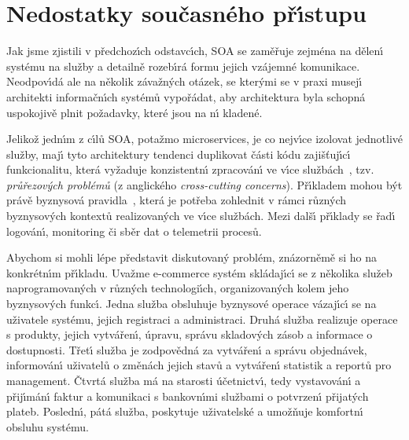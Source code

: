 \section{Nedostatky současného př\'{\i}stupu}

Jak jsme zjistili v předchoz\'{\i}ch odstavc\'{\i}ch, \gls{SOA} se zaměřuje zejména na
dělen\'{\i} systému na služby a detailně rozeb\'{\i}rá formu jejich vzájemné komunikace.
Neodpov\'{\i}dá ale na několik závažn\'ych otázek, se kter\'ymi se v praxi musej\'{\i}
architekti informačn\'{\i}ch systémů vypořádat, aby architektura byla schopná uspokojivě
plnit požadavky, které jsou na n\'{\i} kladené.

Jelikož jedn\'{\i}m z c\'{\i}lů \gls{SOA}, potažmo microservices, je co nejv\'{\i}ce izolovat
jednotlivé služby, maj\'{\i} tyto architektury tendenci duplikovat části kódu
zajišťuj\'{\i}c\'{\i} funkcionalitu, která vyžaduje konzistentn\'{\i} zpracován\'{\i} ve v\'{\i}ce
službách~\cite{cerny2017disambiguation}, tzv. \textit{průřezov\'ych
problémů} (z anglického \textit{cross-cutting concerns}).
Př\'{\i}kladem mohou b\'yt právě byznysová pravidla~\cite{cemus2014aspect}, která je potřeba
zohlednit v rámci různ\'ych byznysov\'ych kontextů realizovan\'ych ve v\'{\i}ce službách.
Mezi dalš\'{\i} př\'{\i}klady se řad\'{\i} logován\'{\i}, monitoring či sběr dat
o telemetrii procesů.

Abychom si mohli lépe představit diskutovan\'y problém, znázorněmě
si ho na konkrétn\'{\i}m př\'{\i}kladu. Uvažme e-commerce systém
skládaj\'{\i}c\'{\i} se z několika služeb naprogramovan\'ych v různ\'ych technologi\'{\i}ch,
organizovan\'ych kolem jeho byznysov\'ych funkc\'{\i}.
Jedna služba obsluhuje byznysové operace vázaj\'{\i}c\'{\i}
se na uživatele systému, jejich registraci a administraci. Druhá
služba realizuje operace s produkty, jejich vytvářen\'{\i}, úpravu,
správu skladov\'ych zásob a informace o dostupnosti. Třet\'{\i} služba je
zodpovědná za vytvářen\'{\i} a správu objednávek, informován\'{\i} uživatelů
o změnách jejich stavů a vytvářen\'{\i} statistik a reportů pro management.
Čtvrtá služba má na starosti účetnictv\'{\i}, tedy vystavován\'{\i} a přij\'{\i}mán\'{\i}
faktur a komunikaci s bankovn\'{\i}mi službami o potvrzen\'{\i} přijat\'ych plateb.
Posledn\'{\i}, pátá služba, poskytuje uživatelské a umožňuje komfortn\'{\i} obsluhu systému.

